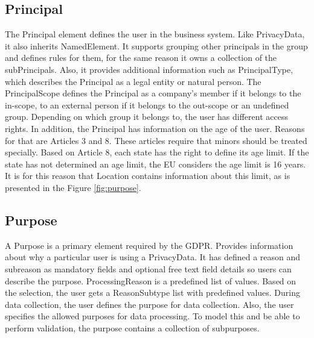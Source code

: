 \documentclass[11pt,english]{article}
\begin{document}
\subsection{Principal}
The Principal element defines the user in the business system. Like PrivacyData, it also inherits NamedElement. It supports grouping other principals in the group and defines rules for them, for the same reason it owns a collection of the subPrincipals. Also, it provides additional information such as PrincipalType, which describes the Principal as a legal entity or natural person. The PrincipalScope defines the Principal as a company's member if it belongs to the in-scope, to an external person if it belongs to the out-scope or an undefined group. Depending on which group it belongs to, the user has different access rights. In addition, the Principal has information on the age of the user. 
Reasons for that are Articles 3 and 8. These articles require that minors should be treated specially. Based on Article 8, each state has the right to define its age limit. If the state has not determined an age limit, the EU considers the age limit is 16 years. It is for this reason that Location contains information about this limit, as is presented in the Figure \ref{fig:purpose}.
\subsection{Purpose}
A Purpose is a primary element required by the GDPR. Provides information about why a particular user is using a PrivacyData. It has defined a reason and subreason as mandatory fields and optional free text field details so users can describe the purpose. ProcessingReason is a predefined list of values. Based on the selection, the user gets a ReasonSubtype list with predefined values. During data collection, the user defines the purpose for data collection. Also, the user specifies the allowed purposes for data processing. To model this and be able to perform validation, the purpose contains a collection of subpurposes. 
\end{document}
